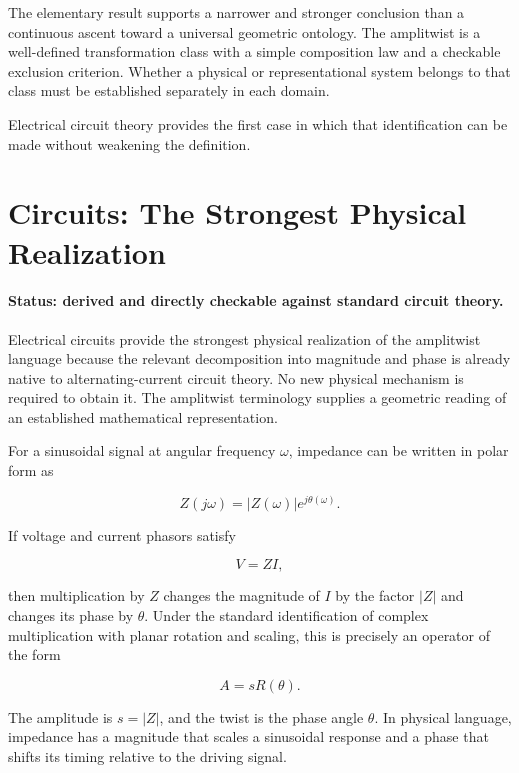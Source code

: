 \documentclass[11pt]{article}
\begin{document}
The elementary result supports a narrower and stronger conclusion than a continuous ascent toward a universal geometric ontology. The amplitwist is a well-defined transformation class with a simple composition law and a checkable exclusion criterion. Whether a physical or representational system belongs to that class must be established separately in each domain.

Electrical circuit theory provides the first case in which that identification can be made without weakening the definition.

\section{Circuits: The Strongest Physical Realization}

\paragraph{Status: derived and directly checkable against standard circuit theory.}

Electrical circuits provide the strongest physical realization of the amplitwist language because the relevant decomposition into magnitude and phase is already native to alternating-current circuit theory. No new physical mechanism is required to obtain it. The amplitwist terminology supplies a geometric reading of an established mathematical representation.

For a sinusoidal signal at angular frequency $\omega$, impedance can be written in polar form as

\begin{equation}
Z(j\omega)
=
|Z(\omega)|e^{j\theta(\omega)}.
\end{equation}

If voltage and current phasors satisfy

\begin{equation}
V=ZI,
\end{equation}

then multiplication by $Z$ changes the magnitude of $I$ by the factor $|Z|$ and changes its phase by $\theta$. Under the standard identification of complex multiplication with planar rotation and scaling, this is precisely an operator of the form

\begin{equation}
A=sR(\theta).
\end{equation}

The amplitude is $s=|Z|$, and the twist is the phase angle $\theta$. In physical language, impedance has a magnitude that scales a sinusoidal response and a phase that shifts its timing relative to the driving signal.
\end{document}

